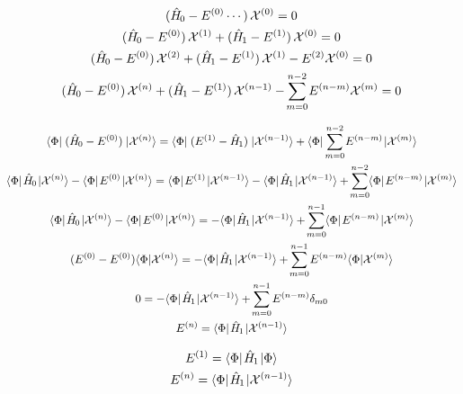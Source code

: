 \documentclass[thesis.tex]{subfiles}
\begin{document}
\begin{gather}
  \mathop{(\Ham_{0} - E^{(0)}\cdots)}\mathcal{X}^{(0)} = 0 \\
  \mathop{(\Ham_{0} - E^{(0)})}\mathcal{X}^{(1)} + \mathop{(\Ham_{1} - E^{(1)})}\mathcal{X}^{(0)} = 0 \\
  \mathop{(\Ham_{0} - E^{(0)})}\mathcal{X}^{(2)} + \mathop{(\Ham_{1} - E^{(1)})}\mathcal{X}^{(1)} - E^{(2)}\mathcal{X}^{(0)} = 0 \\
  \mathop{(\Ham_{0} - E^{(0)})}\mathcal{X}^{(n)} + \mathop{(\Ham_{1} - E^{(1)})}\mathcal{X}^{(n-1)} - \sum^{n-2}_{\mathclap{m=0}} E^{(n-m)}\mathcal{X}^{(m)} = 0
\end{gather}

\begin{gather}
  \refbra\mathop{(\Ham_{0} - E^{(0)})}\ket{\mathcal{X}^{(n)}} = \refbra\mathop{(E^{(1)} - \Ham_{1})}\ket{\mathcal{X}^{(n-1)}} + \refbra\sum^{n-2}_{\mathclap{m=0}} E^{(n-m)}\ket{\mathcal{X}^{(m)}} \\
  \refbra\Ham_{0}\ket{\mathcal{X}^{(n)}} - \refbra E^{(0)}\ket{\mathcal{X}^{(n)}} = \refbra E^{(1)}\ket{\mathcal{X}^{(n-1)}} - \refbra\Ham_{1}\ket{\mathcal{X}^{(n-1)}} + \sum^{n-2}_{\mathclap{m=0}}\refbra E^{(n-m)}\ket{\mathcal{X}^{(m)}} \\
  \refbra\Ham_{0}\ket{\mathcal{X}^{(n)}} - \refbra E^{(0)}\ket{\mathcal{X}^{(n)}} = - \refbra\Ham_{1}\ket{\mathcal{X}^{(n-1)}} + \sum^{n-1}_{\mathclap{m=0}}\refbra E^{(n-m)}\ket{\mathcal{X}^{(m)}} \\
  \mathop{(E^{(0)} - E^{(0)})}\braket{\Phi}{\mathcal{X}^{(n)}} = - \refbra\Ham_{1}\ket{\mathcal{X}^{(n-1)}} + \sum^{n-1}_{\mathclap{m=0}}E^{(n-m)}\braket{\Phi}{\mathcal{X}^{(m)}} \\
  0 = - \refbra\Ham_{1}\ket{\mathcal{X}^{(n-1)}} + \sum^{n-1}_{\mathclap{m=0}}E^{(n-m)}\delta_{m0} \\
  E^{(n)} = \refbra\Ham_{1}\ket{\mathcal{X}^{(n-1)}}
\end{gather}

\begin{gather}
  E^{(1)} = \langle \Phi |\hspace{1pt}\hat{H}\hspace{-1.5pt}_{1}\hspace{1pt}| \Phi \rangle \\
  E^{(n)} = \langle \Phi |\hspace{1pt}\hat{H}\hspace{-1.5pt}_{1}\hspace{1pt}| \mathcal{X}^{(n-1)} \rangle
\end{gather}
\end{document}

